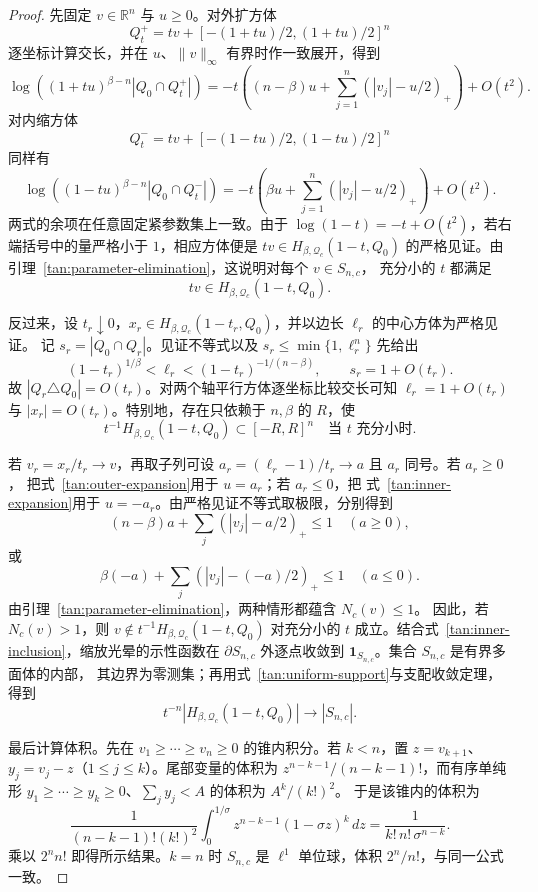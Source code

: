 \begin{proof}
先固定 $v\in\mathbb R^n$ 与 $u\ge0$。对外扩方体
\[
 Q_t^+=tv+[-(1+tu)/2,(1+tu)/2]^n
\]
逐坐标计算交长，并在 $u$、$\|v\|_\infty$ 有界时作一致展开，得到
\begin{equation}
 \log\!\left((1+tu)^{\beta-n}|Q_0\cap Q_t^+|\right)
 =-t\left((n-\beta)u+
 \sum_{j=1}^{n}(|v_j|-u/2)_+\right)+O(t^2).
 \label{tan:outer-expansion}
\end{equation}
对内缩方体
\[
 Q_t^-=tv+[-(1-tu)/2,(1-tu)/2]^n
\]
同样有
\begin{equation}
 \log\!\left((1-tu)^{\beta-n}|Q_0\cap Q_t^-|\right)
 =-t\left(\beta u+
 \sum_{j=1}^{n}(|v_j|-u/2)_+\right)+O(t^2).
 \label{tan:inner-expansion}
\end{equation}
两式的余项在任意固定紧参数集上一致。由于
$\log(1-t)=-t+O(t^2)$，若右端括号中的量严格小于 $1$，相应方体便是
$tv\in H_{\beta,\mathcal Q_c}(1-t,Q_0)$ 的严格见证。由
引理~\ref{tan:parameter-elimination}，这说明对每个 $v\in S_{n,c}$，
充分小的 $t$ 都满足
\begin{equation}
 tv\in H_{\beta,\mathcal Q_c}(1-t,Q_0).
 \label{tan:inner-inclusion}
\end{equation}

反过来，设 $t_r\downarrow0$，$x_r\in
H_{\beta,\mathcal Q_c}(1-t_r,Q_0)$，并以边长 $\ell_r$ 的中心方体为严格见证。
记 $s_r=|Q_0\cap Q_r|$。见证不等式以及 $s_r\le\min\{1,\ell_r^n\}$ 先给出
\[
 (1-t_r)^{1/\beta}<\ell_r<(1-t_r)^{-1/(n-\beta)},
 \qquad s_r=1+O(t_r).
\]
故 $|Q_r\triangle Q_0|=O(t_r)$。对两个轴平行方体逐坐标比较交长可知
$\ell_r=1+O(t_r)$ 与 $|x_r|=O(t_r)$。特别地，存在只依赖于 $n,\beta$ 的
$R$，使
\begin{equation}
 t^{-1}H_{\beta,\mathcal Q_c}(1-t,Q_0)\subset[-R,R]^n
 \quad\text{当 $t$ 充分小时}.
 \label{tan:uniform-support}
\end{equation}

若 $v_r=x_r/t_r\to v$，再取子列可设
$a_r=(\ell_r-1)/t_r\to a$ 且 $a_r$ 同号。若 $a_r\ge0$，
把式~\eqref{tan:outer-expansion}用于 $u=a_r$；若 $a_r\le0$，把
式~\eqref{tan:inner-expansion}用于 $u=-a_r$。由严格见证不等式取极限，分别得到
\[
 (n-\beta)a+\sum_j(|v_j|-a/2)_+\le1
 \quad(a\ge0),
\]
或
\[
 \beta(-a)+\sum_j(|v_j|-(-a)/2)_+\le1
 \quad(a\le0).
\]
由引理~\ref{tan:parameter-elimination}，两种情形都蕴含 $N_c(v)\le1$。
因此，若 $N_c(v)>1$，则 $v\notin t^{-1}H_{\beta,\mathcal Q_c}(1-t,Q_0)$
对充分小的 $t$ 成立。结合式~\eqref{tan:inner-inclusion}，缩放光晕的示性函数在
$\partial S_{n,c}$ 外逐点收敛到 $\mathbf1_{S_{n,c}}$。集合 $S_{n,c}$ 是有界多面体的内部，
其边界为零测集；再用式~\eqref{tan:uniform-support}与支配收敛定理，得到
\[
 t^{-n}|H_{\beta,\mathcal Q_c}(1-t,Q_0)|\to |S_{n,c}|.
\]

最后计算体积。先在 $v_1\ge\cdots\ge v_n\ge0$ 的锥内积分。若 $k<n$，置
$z=v_{k+1}$、$y_j=v_j-z$（$1\le j\le k$）。尾部变量的体积为
$z^{n-k-1}/(n-k-1)!$，而有序单纯形
$y_1\ge\cdots\ge y_k\ge0$、$\sum_jy_j<A$ 的体积为 $A^k/(k!)^2$。
于是该锥内的体积为
\[
 \frac1{(n-k-1)!(k!)^2}
 \int_0^{1/\sigma}z^{n-k-1}(1-\sigma z)^k\,dz
 =\frac1{k!\,n!\,\sigma^{n-k}}.
\]
乘以 $2^n n!$ 即得所示结果。$k=n$ 时 $S_{n,c}$ 是 $\ell^1$ 单位球，体积
$2^n/n!$，与同一公式一致。
\end{proof}

